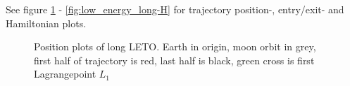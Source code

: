 See figure \ref{fig:low_energy_long-position} - \ref{fig:low_energy_long-H} for trajectory position-, entry/exit- and Hamiltonian plots.

\begin{figure}[ht!]
    \centering
        \caption{Position plots of long LETO. Earth in origin, moon orbit in grey, first half of trajectory is red, last half is black, green cross is first Lagrangepoint $L_1$}
        \label{fig:low_energy_long-position}
\end{figure}

